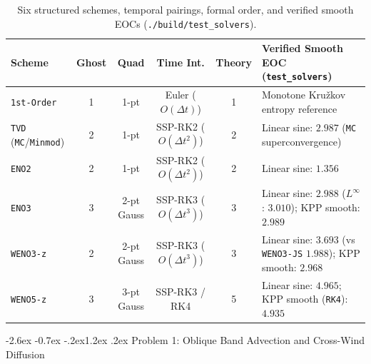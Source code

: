 \documentclass[11pt,a4paper]{article}
\makeatletter
\renewcommand{\section}{\@startsection{section}{1}{\z@}%
  {-2.6ex \@plus -0.7ex \@minus -.2ex}{1.2ex \@plus .2ex}%
  {\normalfont\large\bfseries\color{specnavy}}}
\newcommand{\code}[1]{\texttt{#1}}
\theoremstyle{definition}
\makeatother
\begin{document}
\begin{table}[h]
\centering\scriptsize\setlength{\tabcolsep}{3.6pt}
\caption{Six structured schemes, temporal pairings, formal order, and verified smooth EOCs (\code{./build/test\_solvers}).}
\label{tab:schemes}
\begin{tabular}{@{}lcccc >{\raggedright\arraybackslash}p{5.0cm}@{}}
\toprule
\textbf{Scheme} & \textbf{Ghost} & \textbf{Quad} & \textbf{Time Int.} & \textbf{Theory} & \textbf{Verified Smooth EOC (\code{test\_solvers})} \\
\midrule
\code{1st-Order} & 1 & 1-pt & Euler ($O(\Delta t)$) & 1 & Monotone Kru\v{z}kov entropy reference \\
\code{TVD} (\code{MC}/\code{Minmod}) & 2 & 1-pt & SSP-RK2 ($O(\Delta t^2)$) & 2 & Linear sine: $2.987$ (\code{MC} superconvergence) \\
\code{ENO2} & 2 & 1-pt & SSP-RK2 ($O(\Delta t^2)$) & 2 & Linear sine: $1.356$ \\
\code{ENO3} & 3 & 2-pt Gauss & SSP-RK3 ($O(\Delta t^3)$) & 3 & Linear sine: $2.988$ ($L^\infty$: $3.010$); KPP smooth: $2.989$ \\
\code{WENO3-z} & 2 & 2-pt Gauss & SSP-RK3 ($O(\Delta t^3)$) & 3 & Linear sine: $3.693$ (vs \code{WENO3-JS} $1.988$); KPP smooth: $2.968$ \\
\code{WENO5-z} & 3 & 3-pt Gauss & SSP-RK3 / RK4 & 5 & Linear sine: $4.965$; KPP smooth (\code{RK4}): $4.935$ \\
\bottomrule
\end{tabular}
\end{table}

\section{Problem 1: Oblique Band Advection and Cross-Wind Diffusion}
\end{document}
